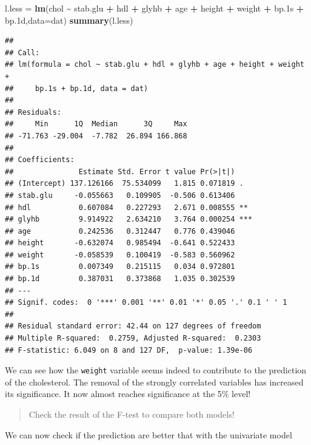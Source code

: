 \documentclass[
]{book}
\newenvironment{Shaded}{\begin{snugshade}}{\end{snugshade}}
\newcommand{\AttributeTok}[1]{\textcolor[rgb]{0.13,0.29,0.53}{#1}}
\newcommand{\FloatTok}[1]{\textcolor[rgb]{0.00,0.00,0.81}{#1}}
\newcommand{\FunctionTok}[1]{\textcolor[rgb]{0.13,0.29,0.53}{\textbf{#1}}}
\newcommand{\NormalTok}[1]{#1}
\newcommand{\OtherTok}[1]{\textcolor[rgb]{0.56,0.35,0.01}{#1}}
\newcommand{\SpecialCharTok}[1]{\textcolor[rgb]{0.81,0.36,0.00}{\textbf{#1}}}
\begin{document}
\begin{Shaded}
\begin{Highlighting}[]
\NormalTok{l.less }\OtherTok{=} \FunctionTok{lm}\NormalTok{(chol }\SpecialCharTok{\textasciitilde{}}\NormalTok{ stab.glu }\SpecialCharTok{+}\NormalTok{ hdl }\SpecialCharTok{+}\NormalTok{ glyhb }\SpecialCharTok{+}\NormalTok{ age }\SpecialCharTok{+}\NormalTok{ height }\SpecialCharTok{+}\NormalTok{ weight  }\SpecialCharTok{+}\NormalTok{ bp}\FloatTok{.1}\NormalTok{s }\SpecialCharTok{+}\NormalTok{ bp}\FloatTok{.1}\NormalTok{d,}\AttributeTok{data=}\NormalTok{dat)}
\FunctionTok{summary}\NormalTok{(l.less)}
\end{Highlighting}
\end{Shaded}

\begin{verbatim}
## 
## Call:
## lm(formula = chol ~ stab.glu + hdl + glyhb + age + height + weight + 
##     bp.1s + bp.1d, data = dat)
## 
## Residuals:
##     Min      1Q  Median      3Q     Max 
## -71.763 -29.004  -7.782  26.894 166.868 
## 
## Coefficients:
##               Estimate Std. Error t value Pr(>|t|)    
## (Intercept) 137.126166  75.534099   1.815 0.071819 .  
## stab.glu     -0.055663   0.109905  -0.506 0.613406    
## hdl           0.607084   0.227293   2.671 0.008555 ** 
## glyhb         9.914922   2.634210   3.764 0.000254 ***
## age           0.242536   0.312447   0.776 0.439046    
## height       -0.632074   0.985494  -0.641 0.522433    
## weight       -0.058539   0.100419  -0.583 0.560962    
## bp.1s         0.007349   0.215115   0.034 0.972801    
## bp.1d         0.387031   0.373868   1.035 0.302539    
## ---
## Signif. codes:  0 '***' 0.001 '**' 0.01 '*' 0.05 '.' 0.1 ' ' 1
## 
## Residual standard error: 42.44 on 127 degrees of freedom
## Multiple R-squared:  0.2759, Adjusted R-squared:  0.2303 
## F-statistic: 6.049 on 8 and 127 DF,  p-value: 1.39e-06
\end{verbatim}

We can see how the \texttt{weight} variable seems indeed to contribute to the prediction of the cholesterol. The removal of the strongly correlated variables has increased its significance. It now almost reaches significance at the 5\% level!

\begin{quote}
Check the result of the F-test to compare both models!
\end{quote}

We can now check if the prediction are better that with the univariate model
\end{document}
